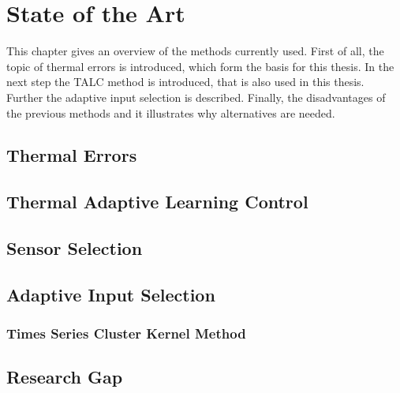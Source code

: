 \chapter{State of the Art}
\label{chp:stateoftheart}

This chapter gives an overview of the methods currently used. First of all, the topic of thermal errors is introduced, which form the basis for this thesis. In the next step the TALC method is introduced, that is also used in this thesis. Further the adaptive input selection is described. Finally, the disadvantages of the previous methods and it illustrates why alternatives are needed.

\section{Thermal Errors}
\label{sec:thermalerrors}






\section{Thermal Adaptive Learning Control}
\label{sec:TALC}





\section{Sensor Selection}
\label{sec:sensor_selectiom}




\section{Adaptive Input Selection}
\label{sec:Adaptiveinputselection}




\subsection{Times Series Cluster Kernel Method}
\label{sec:introTCK}





\section{Research Gap}
\label{sec:researchgap}



